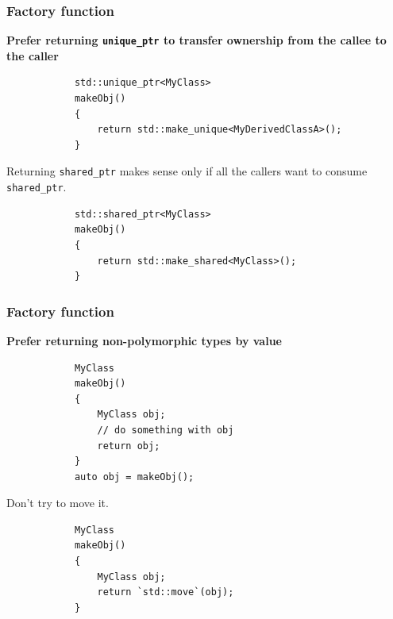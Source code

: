 \documentclass{beamer}
\begin{document}
\begin{frame}[fragile]
\frametitle{Factory function}
	\textbf{Prefer returning \texttt{unique\_ptr} to transfer ownership from the callee to the
			caller}
	\begin{example}
		\begin{lstlisting}
			std::unique_ptr<MyClass>
			makeObj()
			{
				return std::make_unique<MyDerivedClassA>();
			}
		\end{lstlisting}
	\end{example}
	Returning \texttt{shared\_ptr} makes sense only if all the callers want to consume
	\texttt{shared\_ptr}. 
	\begin{example}
		\begin{lstlisting}
			std::shared_ptr<MyClass>
			makeObj()
			{
				return std::make_shared<MyClass>();
			}
		\end{lstlisting}
	\end{example}
\end{frame}

\begin{frame}[fragile]
\frametitle{Factory function}
	\textbf{Prefer returning non-polymorphic types by value}
	\begin{example}
		\begin{lstlisting}
			MyClass
			makeObj()
			{
				MyClass obj;
				// do something with obj
				return obj;
			}
			auto obj = makeObj();
		\end{lstlisting}
	\end{example}
	Don't try to move it.
	\begin{example}
		\begin{lstlisting}
			MyClass
			makeObj()
			{
				MyClass obj;
				return `std::move`(obj);
			}
		\end{lstlisting}
	\end{example}
\end{frame}
\end{document}

